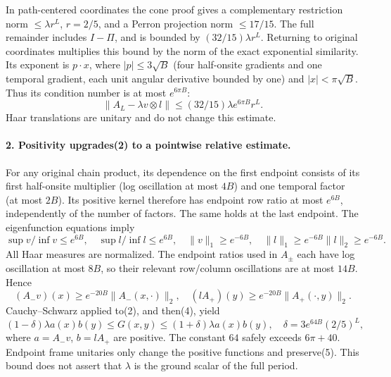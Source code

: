 \documentclass[11pt]{article}
\begin{document}
In path-centered coordinates the cone proof gives a complementary restriction
norm $\le\lambda r^L$, $r=2/5$, and a Perron projection norm $\le17/15$.
The full remainder includes $I-\Pi$, and is bounded by
$(32/15)\lambda r^L$. Returning to original coordinates multiplies this bound
by the norm of the exact exponential similarity. Its exponent is
$p\cdot x$, where $|p|\le3\sqrt B$ (four half-onsite gradients and one temporal
gradient, each unit angular derivative bounded by one) and
$|x|<\pi\sqrt B$. Thus its condition number is at most $e^{6\pi B}$:
\[
 \|A_L-\lambda v\otimes l\|\le(32/15)\lambda e^{6\pi B}r^L.             \tag{2}
\]
Haar translations are unitary and do not change this estimate.

\paragraph{2. Positivity upgrades(2) to a pointwise relative estimate.}
For any original chain product, its dependence on the first endpoint consists
of its first half-onsite multiplier (log oscillation at most $4B$) and one
temporal factor (at most $2B$). Its positive kernel therefore has endpoint
row ratio at most $e^{6B}$, independently of the number of factors. The same
holds at the last endpoint. The eigenfunction equations imply
\[
 \sup v/\inf v\le e^{6B},\quad \sup l/\inf l\le e^{6B},\quad
 \|v\|_1\ge e^{-6B},\quad \|l\|_1\ge e^{-6B}\|l\|_2\ge e^{-6B}.          \tag{3}
\]
All Haar measures are normalized. The endpoint ratios used in $A_\pm$ each
have log oscillation at most $8B$, so their relevant row/column oscillations
are at most $14B$. Hence
\[
 (A_-v)(x)\ge e^{-20B}\|A_-(x,\cdot)\|_2,
 \quad (lA_+)(y)\ge e^{-20B}\|A_+(\cdot,y)\|_2.                         \tag{4}
\]
Cauchy--Schwarz applied to(2), and then(4), yield
\[
 (1-\delta)\lambda a(x)b(y)\le G(x,y)
       \le(1+\delta)\lambda a(x)b(y),\quad
 \delta=3e^{64B}(2/5)^L,                                                \tag{5}
\]
where $a=A_-v$, $b=lA_+$ are positive. The constant $64$ safely exceeds
$6\pi+40$. Endpoint frame unitaries only change the positive functions and
preserve(5). This bound does not assert that $\lambda$ is the ground scalar
of the full period.
\end{document}
